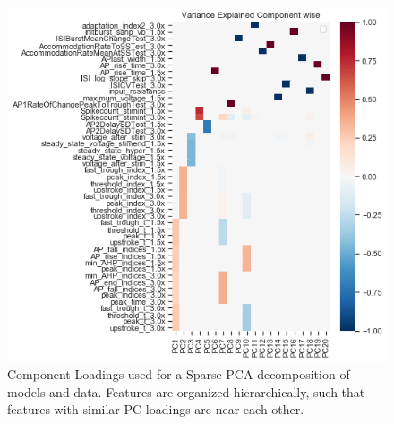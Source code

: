 \begin{figure}    
    \begin{center}
    \includegraphics[scale=0.75]{figures/cortical_model_data_agreement_54_1.png}
    \caption[Sparse PCA Components]{Component Loadings used for a Sparse PCA decomposition of models and data.
    Features are organized hierarchically, such that features with similar PC loadings are near each other.}
    \end{center}
    \label{fig:spca-heatmap}
\end{figure}    

